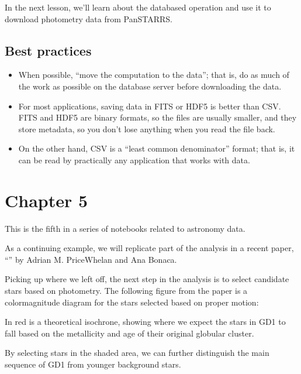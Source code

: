 \documentclass[letterpaper,10pt,english]{sphinxmanual}
\begin{document}
In the next lesson, we’ll learn about the databased  operation and use it to download photometry data from Pan\sphinxhyphen{}STARRS.


\section{Best practices}
\label{\detokenize{04_select:best-practices}}\begin{itemize}
\item {} 
When possible, “move the computation to the data”; that is, do as much of the work as possible on the database server before downloading the data.

\item {} 
For most applications, saving data in FITS or HDF5 is better than CSV.  FITS and HDF5 are binary formats, so the files are usually smaller, and they store metadata, so you don’t lose anything when you read the file back.

\item {} 
On the other hand, CSV is a “least common denominator” format; that is, it can be read by practically any application that works with data.

\end{itemize}


\chapter{Chapter 5}
\label{\detokenize{05_join:chapter-5}}\label{\detokenize{05_join::doc}}
This is the fifth in a series of notebooks related to astronomy data.

As a continuing example, we will replicate part of the analysis in a recent paper, “” by Adrian M. Price\sphinxhyphen{}Whelan and Ana Bonaca.

Picking up where we left off, the next step in the analysis is to select candidate stars based on photometry.  The following figure from the paper is a color\sphinxhyphen{}magnitude diagram for the stars selected based on proper motion:



In red is a theoretical isochrone, showing where we expect the stars in GD\sphinxhyphen{}1 to fall based on the metallicity and age of their original globular cluster.

By selecting stars in the shaded area, we can further distinguish the main sequence of GD\sphinxhyphen{}1 from younger background stars.
\end{document}
